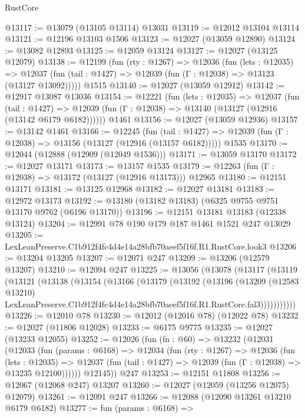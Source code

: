 \begin{lexlean}{RustCore}
\begin{coremodule}
@13117 := @13079 (@13105 @13114) @13031
@13119 := @12012 @13104 @13114
@13121 := @12196 @13103 @1506
@13123 := @12027 (@13059 @12890)
@13124 := @13082 @12893
@13125 := @12059 @13124
@13127 := @12027 (@13125 @12079)
@13138 := @12199
    (fun (rty : @1267) =>
    @12036
      (fun (lets : @12035) =>
      @12037 (fun (tail : @1427) => @12039 (fun (Γ : @12038) => @13123 (@13127 @13092)))))
    @1515
@13140 := @12027 (@13059 @12912)
@13142 := @12917 @13087 @13036
@13154 := @12221
    (fun (lets : @12035) =>
    @12037
      (fun (tail : @1427) =>
      @12039 (fun (Γ : @12038) => @13140 (@13127 (@12916 (@13142 @6179 @6182))))))
    @1461
@13156 := @12027 (@13059 @12936)
@13157 := @13142 @1461
@13166 := @12245
    (fun (tail : @1427) => @12039 (fun (Γ : @12038) => @13156 (@13127 (@12916 (@13157 @6182)))))
    @1535
@13170 := @12044 (@12888 (@12909 (@12049 @1536)))
@13171 := @13059 @13170
@13172 := @12027 @13171
@13173 := @13157 @1535
@13179 := @12263 (fun (Γ : @12038) => @13172 (@13127 (@12916 @13173))) @12965
@13180 := @12151 @13171
@13181 := @13125 @12968
@13182 := @12027 @13181
@13183 := @12972 @13173
@13192 := @13180 (@13182 @13183) (@6325 @9755 @9751 @13170 @9762 (@6196 @13170))
@13196 := @12151 @13181 @13183 (@12338 @13124)
@13204 := @12991 @78 @190 @179 @187 @1461 @1521 @247 @13029
@13205 := LexLeanPreserve.C1b912f4fc4d4e14a28bfb70aeef5f16f.R1.RustCore.look3
@13206 := @13204 @13205
@13207 := @12071 @247
@13209 := @13206 (@12579 @13207)
@13210 := @12094 @247
@13225 := @13056
    (@13078
      (@13117
        (@13119
          (@13121
            (@13138
              (@13154
                (@13166
                  (@13179
                    (@13192
                      (@13196
                        (@13209
                          (@12583 @13210)
                          LexLeanPreserve.C1b912f4fc4d4e14a28bfb70aeef5f16f.R1.RustCore.fal3)))))))))))
@13226 := @12010 @78
@13230 := @12012 (@12016 @78) (@12022 @78)
@13232 := @12027 (@11806 @12028)
@13233 := @6175 @9775
@13235 := @12027 (@13233 @12055)
@13252 := @12026
    (fun (fn : @60) =>
    @13232
      (@12031
        (@12033
          (fun (params : @6168) =>
          @12034
            (fun (rty : @1267) =>
            @12036
              (fun (lets : @12035) =>
              @12037 (fun (tail : @1427) => @12039 (fun (Γ : @12038) => @13235 @12100))))))
        @12145))
    @247
@13253 := @12151 @11808
@13256 := @12067 (@12068 @247) @13207
@13260 := @12027 (@12059 (@13256 @12075) @12079)
@13261 := @12091 @247
@13266 := @12088 (@12090 @13261 @13210 @6179 @6182)
@13277 := fun (params : @6168) =>

\end{coremodule}
\end{lexlean}
